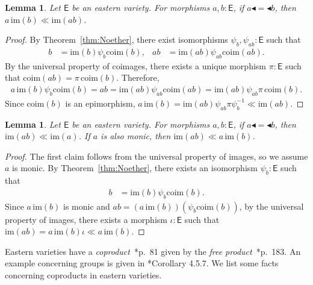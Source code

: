 \documentclass{amsart}
\newcommand{\tin}{:}
\newcommand{\acat}[1]{\mathsf{#1}}
\numberwithin{lstfloat}{section}
\newcommand{\srcfunc}{\mathbin{\blacktriangleleft}}
\newcommand{\tgtfunc}{\mathbin{\blacktriangleleft}}
\newcommand{\src}[1]{#1\srcfunc}
\newcommand{\tgt}[1]{\tgtfunc #1}
\newtheorem{lem}[thm]{Lemma}
\theoremstyle{definition}
\theoremstyle{remark}
\numberwithin{equation}{section}
\begin{document}
\begin{lem}\label{lem:im}
  Let $\acat{E}$ be an eastern variety. 
For morphisms $a,b\tin \acat{E}$, if 
  $\src{a}=\tgt{b}$, then $a\,\mathrm{im}(b) \ll \mathrm{im}(ab)$.
\end{lem}

\begin{proof}
  By Theorem~\ref{thm:Noether}, there exist isomorphisms $\psi_b, \psi_{ab} : \acat{E}$
  such that 
  \begin{align*}
    b &= \mathrm{im}(b)\psi_b\mathrm{coim}(b), & ab &= \mathrm{im}(ab)\psi_{ab}\mathrm{coim}(ab) .
  \end{align*}
  By the universal property of coimages, there exists a unique morphism
  $\pi:\acat{E}$ such that $\mathrm{coim}(ab) = \pi\,\mathrm{coim}(b)$.
  Therefore, 
  \begin{align*}
    a\,\mathrm{im}(b)\psi_b\mathrm{coim}(b) = ab = \mathrm{im}(ab) \psi_{ab} \mathrm{coim}(ab) = \mathrm{im}(ab) \psi_{ab} \pi\, \mathrm{coim}(b).
  \end{align*}
  Since $\mathrm{coim}(b)$ is an epimorphism, $a\,\mathrm{im}(b) =
  \mathrm{im}(ab) \psi_{ab} \pi \psi_b^{-1} \ll \mathrm{im}(ab)$.
\end{proof}

\begin{lem}\label{lem:im-monic}
  Let $\acat{E}$ be an eastern variety. For morphisms $a,b\tin \acat{E}$, if
  $\src{a}=\tgt{b}$, then 
  $\mathrm{im}(ab)\ll \mathrm{im}(a)$. If $a$ is also monic, then 
  $\mathrm{im}(ab) \ll a\,\mathrm{im}(b)$.
\end{lem}

\begin{proof}
  The first claim follows from the universal property of images, so we assume $a$ is monic.
  By Theorem~\ref{thm:Noether}, there exists an isomorphism $\psi_b : \acat{E}$ such
  that 
  \begin{align*}
    b &= \mathrm{im}(b)\psi_b\mathrm{coim}(b) .
  \end{align*}
  Since $a\,\mathrm{im}(b)$ is monic and
  $ab=(a\,\mathrm{im}(b))(\psi_b\mathrm{coim}(b))$, by the universal property of
  images, there exists a morphism $\iota : \acat{E}$ such that $\mathrm{im}(ab)
  = a\,\mathrm{im}(b)\iota\ll a\,\mathrm{im}(b)$.
\end{proof}

Eastern varieties have a \emph{coproduct}~\cite{Riehl}*{p.~81} given by
the \emph{free product}~\cite{Riehl}*{p.~183}.  
An example concerning groups is given in \cite{Riehl}*{Corollary 4.5.7}. 
We list some facts concerning coproducts in eastern varieties.
\end{document}
